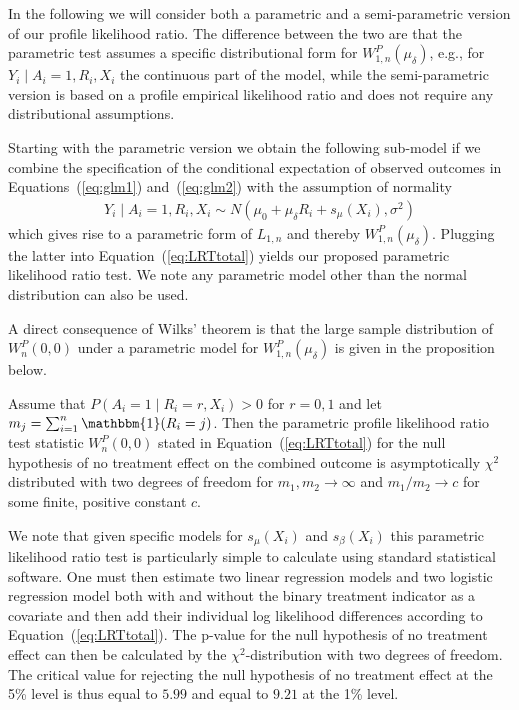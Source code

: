 In the following we will consider both a parametric and a semi-parametric version of our profile likelihood ratio. The difference between the two are that the parametric test assumes a specific distributional form for $W_{1,n}^P(\mu_\delta)$, e.g., for $Y_i \mid A_i = 1, R_i, X_i$ the continuous part of the model, while the semi-parametric version is based on a profile empirical likelihood ratio and does not require any distributional assumptions.

Starting with the parametric version we obtain the following sub-model if we combine the specification of the conditional expectation of observed outcomes in Equations~(\ref{eq:glm1}) and~(\ref{eq:glm2}) with the assumption of normality
\begin{align*}
  Y_i \mid A_i = 1, R_i, X_i \sim N\left(\mu_0 + \mu_\delta R_i + s_\mu(X_i), \sigma^2\right)
\end{align*}
which gives rise to a parametric form of $L_{1,n}$ and thereby $W_{1,n}^P(\mu_\delta)$. Plugging the latter into Equation~(\ref{eq:LRTtotal}) yields our proposed parametric likelihood ratio test. We note any parametric model other than the normal distribution can also be used.

A direct consequence of Wilks' theorem \citep{wilks1938large} is that the large sample distribution of $W_n^P(0, 0)$ under a parametric model for $W_{1,n}^P(\mu_\delta)$ is given in the proposition below.

\begin{proposition}
Assume that $P(A_i = 1 \mid R_i = r, X_i) > 0$ for $r = 0, 1$ and let $m_j = \sum_{i = 1}^n \mathbbm{1}(R_i = j)$. Then the parametric profile likelihood ratio test statistic $W_n^P(0,0)$ stated in Equation~(\ref{eq:LRTtotal}) for the null hypothesis of no treatment effect on the combined outcome is asymptotically $\chi^2$ distributed with two degrees of freedom for $m_1, m_2 \rightarrow \infty$ and $m_1 / m_2 \rightarrow c$ for some finite, positive constant $c$.
\end{proposition}

We note that given specific models for $s_\mu(X_i)$ and $s_\beta(X_i)$ this parametric likelihood ratio test is particularly simple to calculate using standard statistical software. One must then estimate two linear regression models and two logistic regression model both with and without the binary treatment indicator as a covariate and then add their individual log likelihood differences according to Equation~(\ref{eq:LRTtotal}). The p-value for the null hypothesis of no treatment effect can then be calculated by the $\chi^2$-distribution with two degrees of freedom. The critical value for rejecting the null hypothesis of no treatment effect at the 5\% level is thus equal to $5.99$ and equal to $9.21$ at the 1\% level.

